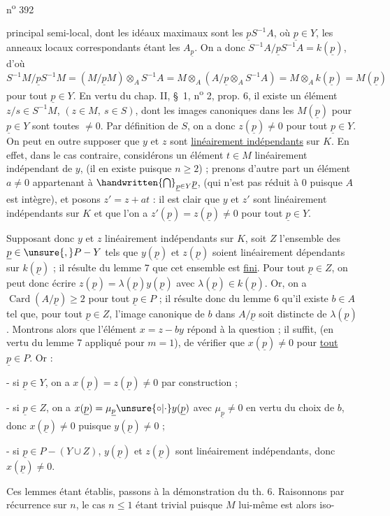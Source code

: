 \noindent\hfill n\textsuperscript{o} 392\par

principal semi-local, dont les idéaux maximaux sont les $\underline{p}S^{-1}A$, où $\underline{p}\in Y$, les anneaux locaux correspondants étant les $A_{\underline{p}}$. On a donc $S^{-1}A/\underline{p}S^{-1}A=k(\underline{p})$, d'où $S^{-1}M/\underline{p}S^{-1}M=(M/\underline{p}M)\otimes_A S^{-1}A=M\otimes_A(A/\underline{p}\otimes_A S^{-1}A)=M\otimes_A k(\underline{p})=M(\underline{p})$ pour tout $\underline{p}\in Y$. En vertu du chap. II, \S~1, n\textsuperscript{o} 2, prop. 6, il existe un élément $z/s\in S^{-1}M$, $(z\in M,\ s\in S)$, dont les images canoniques dans les $M(\underline{p})$ pour $\underline{p}\in Y$ sont toutes $\ne 0$. Par définition de $S$, on a donc $z(\underline{p})\ne 0$ pour tout $\underline{p}\in Y$. On peut en outre supposer que $y$ et $z$ sont \uline{linéairement indépendants} sur $K$. En effet, dans le cas contraire, considérons un élément $t\in M$ linéairement indépendant de $y$, (il en existe puisque $n\geq 2$) ; prenons d'autre part un élément $a\ne 0$ appartenant à $\handwritten{\bigcap}_{\underline{p}\in Y}\underline{p}$, (qui n'est pas réduit à 0 puisque $A$ est intègre), et posons $z'=z+at$ : il est clair que $y$ et $z'$ sont linéairement indépendants sur $K$ et que l'on a $z'(\underline{p})=z(\underline{p})\ne 0$ pour tout $\underline{p}\in Y$.

Supposant donc $y$ et $z$ linéairement indépendants sur $K$, soit $Z$ l'ensemble des $\underline{p}\in\unsure{,} P-Y$ tels que $y(\underline{p})$ et $z(\underline{p})$ soient linéairement dépendants sur $k(\underline{p})$ ; il résulte du lemme 7 que cet ensemble est \uline{fini}. Pour tout $\underline{p}\in Z$, on peut donc écrire $z(\underline{p})=\lambda(\underline{p})y(\underline{p})$ avec $\lambda(\underline{p})\in k(\underline{p})$. Or, on a $\operatorname{Card}(A/\underline{p})\geq 2$ pour tout $\underline{p}\in P$ ; il résulte donc du lemme 6 qu'il existe $b\in A$ tel que, pour tout $\underline{p}\in Z$, l'image canonique de $b$ dans $A/\underline{p}$ soit distincte de $\lambda(\underline{p})$. Montrons alors que l'élément $x=z-by$ répond à la question ; il suffit, (en vertu du lemme 7 appliqué pour $m=1$), de vérifier que $x(\underline{p})\ne 0$ pour \uline{tout} $\underline{p}\in P$. Or :

- si $\underline{p}\in Y$, on a $x(\underline{p})=z(\underline{p})\ne 0$ par construction ;

- si $\underline{p}\in Z$,\unsure{\textbackslash} on a $x(\underline{p})=\mu_{\underline{p}}\unsure{\circ|\cdot}y(\underline{p})$ avec $\mu_{\underline{p}}\ne 0$ en vertu du choix de $b$, donc $x(\underline{p})\ne 0$ puisque $y(\underline{p})\ne 0$ ;

- si $\underline{p}\in P-(Y\cup Z)$, $y(\underline{p})$ et $z(\underline{p})$ sont linéairement indépendants, donc $x(\underline{p})\ne 0$.

Ces lemmes étant établis, passons à la démonstration du th. 6. Raisonnons par récurrence sur $n$, le cas $n\leq 1$ étant trivial puisque $M$ lui-même est alors iso-

